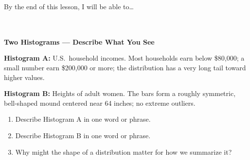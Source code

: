 \documentclass[10pt]{article}
\begin{document}
\namedateperiod

\vspace{0.12in}

\begin{objectivebox}
\small By the end of this lesson, I will be able to\dots\\[4pt]
\writeline\\[1pt]
\writeline\\[1pt]
\writeline
\end{objectivebox}

\vspace{0.1in}

\begin{vocabbox}
\end{vocabbox}

\vspace{0.1in}

\begin{hookbox}
\small\textbf{Two Histograms --- Describe What You See}

\vspace{8pt}
\textbf{Histogram A:} U.S.\ household incomes. Most households earn below
\$80{,}000; a small number earn \$200{,}000 or more; the distribution has a
very long tail toward higher values.

\vspace{6pt}
\textbf{Histogram B:} Heights of adult women. The bars form a roughly
symmetric, bell-shaped mound centered near 64 inches; no extreme outliers.

\vspace{8pt}
\begin{enumerate}[leftmargin=1.5em, itemsep=6pt]
  \item Describe Histogram A in one word or phrase.\\[5pt]
        \writeline

  \item Describe Histogram B in one word or phrase.\\[5pt]
        \writeline

  \item Why might the shape of a distribution matter for how we
        summarize it?\\[5pt]
        \writeline\\[1pt]\writeline
\end{enumerate}
\end{hookbox}
\end{document}
